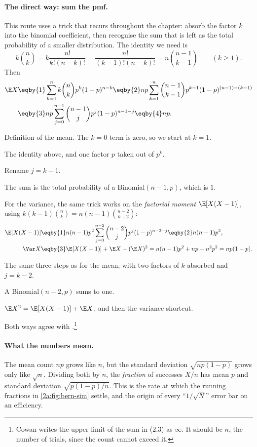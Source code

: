 \paragraph{The direct way: sum the pmf.} This route uses a trick that recurs throughout the chapter: absorb the factor $k$ into the binomial coefficient, then recognise the sum that is left as the total probability of a smaller distribution. The identity we need is
\[
  k\binom nk = k\frac{n!}{k!(n-k)!} = \frac{n!}{(k-1)!(n-k)!} = n\binom{n-1}{k-1}\qquad (k\ge1).
\]
Then
\begin{align*}
  \E X &\eqby{1} \sum_{k=1}^n k\binom nk p^k(1-p)^{n-k}
   \eqby{2} np\sum_{k=1}^n\binom{n-1}{k-1}p^{k-1}(1-p)^{(n-1)-(k-1)}\\
  &\eqby{3} np\sum_{j=0}^{n-1}\binom{n-1}{j}p^{j}(1-p)^{n-1-j}
   \eqby{4} np .
\end{align*}
\begin{explain}
  \item Definition of the mean. The $k=0$ term is zero, so we start at $k=1$.
  \item The identity above, and one factor $p$ taken out of $p^k$.
  \item Rename $j=k-1$.
  \item The sum is the total probability of a Binomial$(n-1,p)$, which is $1$.
\end{explain}
For the variance, the same trick works on the \emph{factorial moment} $\E[X(X-1)]$, using $k(k-1)\binom nk=n(n-1)\binom{n-2}{k-2}$:
\begin{align*}
  \E[X(X-1)] &\eqby{1} n(n-1)p^2\sum_{j=0}^{n-2}\binom{n-2}{j}p^j(1-p)^{n-2-j} \eqby{2} n(n-1)p^2,\\
  \Var X &\eqby{3} \E[X(X-1)]+\E X-(\E X)^2 = n(n-1)p^2+np-n^2p^2 = np(1-p).
\end{align*}
\begin{explain}
  \item The same three steps as for the mean, with two factors of $k$ absorbed and $j=k-2$.
  \item A Binomial$(n-2,p)$ sums to one.
  \item $\E X^2=\E[X(X-1)]+\E X$, and then the variance shortcut.
\end{explain}
Both ways agree with .\footnote{Cowan writes the upper limit of the sum in (2.3) as $\infty$. It should be $n$, the number of trials, since the count cannot exceed it.}

\paragraph{What the numbers mean.} The mean count $np$ grows like $n$, but the standard deviation $\sqrt{np(1-p)}$ grows only like $\sqrt n$. Dividing both by $n$, the \emph{fraction} of successes $X/n$ has mean $p$ and standard deviation $\sqrt{p(1-p)/n}$. This is the rate at which the running fractions in \cref{2a:fig:bern-sim} settle, and the origin of every ``$1/\sqrt N$'' error bar on an efficiency.

